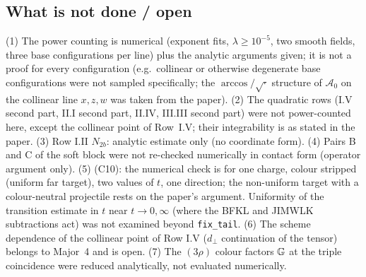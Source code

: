 \subsection{What is not done / open}\label{sec:r3f-open}
\noindent (1) The power counting is numerical (exponent fits, $\lambda\ge10^{-5}$, two smooth fields, three base configurations per line) plus the analytic arguments given; it is not a proof for every configuration (e.g.\ collinear or otherwise degenerate base configurations were not sampled specifically; the $\arccos/\sqrt{\cdot}$ structure of $\mathcal A_0$ on the collinear line $x,z,w$ was taken from the paper). (2) The quadratic rows (I.V second part, II.I second part, II.IV, III.III second part) were not power-counted here, except the collinear point of Row~I.V; their integrability is as stated in the paper. (3) Row I.II $N_{2b}$: analytic estimate only (no coordinate form). (4) Pairs B and C of the soft block were not re-checked numerically in contact form (operator argument only). (5) (C10): the numerical check is for one charge, colour stripped (uniform far target), two values of $t$, one direction; the non-uniform target with a colour-neutral projectile rests on the paper's argument. Uniformity of the transition estimate in $t$ near $t\to0,\infty$ (where the BFKL and JIMWLK subtractions act) was not examined beyond \texttt{fix\_tail}. (6) The scheme dependence of the collinear point of Row I.V ($d_\perp$ continuation of the tensor) belongs to Major~4 and is open. (7) The $(3\rho)$ colour factors $\mathbb{G}$ at the triple coincidence were reduced analytically, not evaluated numerically.
